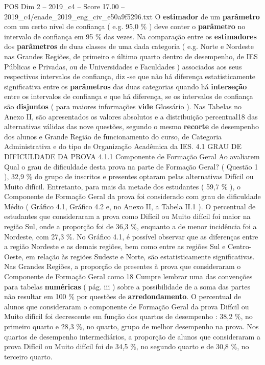 \begin{textsample}{POS Dim 2 – 2019\_c4 – Score 17.00 – 2019\_c4/enade\_2019\_eng\_civ\_e50a9f5296.txt}
O \textbf{estimador} de um \textbf{parâmetro} com um certo nível de confiança ( e.g. 95,0 \% ) deve conter o \textbf{parâmetro} no intervalo de confiança em 95 \% das vezes.
Na comparação entre os \textbf{estimadores} dos \textbf{parâmetros} de duas classes de uma dada categoria ( e.g.
Norte e Nordeste nas Grandes Regiões, de primeiro e último quarto dentro de desempenho, de IES Públicas e Privadas, ou de Universidades e Faculdades ) associados aos seus respectivos intervalos de confiança, diz -se que não há diferença estatisticamente significativa entre os \textbf{parâmetros} das duas categorias quando há \textbf{interseção} entre os intervalos de confiança e que há diferença, se os intervalos de confiança são \textbf{disjuntos} ( para maiores informações \textbf{vide} Glossário ).
Nas Tabelas no Anexo II, são apresentados os valores absolutos e a distribuição percentual18 das alternativas válidas das nove questões, segundo o mesmo \textbf{recorte} de desempenho dos alunos e Grande Região de funcionamento do curso, de Categoria Administrativa e do tipo de Organização Acadêmica da IES. 4.1 GRAU DE DIFICULDADE DA PROVA 4.1.1 Componente de Formação Geral Ao avaliarem Qual o grau de dificuldade desta prova na parte de Formação Geral? ( Questão 1 ), 32,9 \% do grupo de inscritos e presentes optaram pelas alternativas Difícil ou Muito difícil.
Entretanto, para mais da metade dos estudantes ( 59,7 \% ), o Componente de Formação Geral da prova foi considerado com grau de dificuldade Médio ( Gráfico 4.1, Gráfico 4.2 e, no Anexo II, a Tabela II.1 ).
O percentual de estudantes que consideraram a prova como Difícil ou Muito difícil foi maior na região Sul, onde a proporção foi de 36,3 \%, enquanto a de menor incidência foi a Nordeste, com 27,3 \%.
No Gráfico 4.1, é possível observar que as diferenças entre a região Nordeste e as demais regiões, bem como entre as regiões Sul e Centro-Oeste, em relação às regiões Sudeste e Norte, são estatisticamente significativas.
Nas Grandes Regiões, a proporção de presentes à prova que consideraram o Componente de Formação Geral como 18 Cumpre lembrar uma das convenções para tabelas \textbf{numéricas} ( pág. iii ) sobre a possibilidade de a soma das partes não resultar em 100 \% por questões de \textbf{arredondamento}.
O percentual de alunos que consideraram o componente de Formação Geral da prova Difícil ou Muito difícil foi decrescente em função dos quartos de desempenho : 38,2 \%, no primeiro quarto e 28,3 \%, no quarto, grupo de melhor desempenho na prova.
Nos quartos de desempenho intermediários, a proporção de alunos que consideraram a prova Difícil ou Muito difícil foi de 34,5 \%, no segundo quarto e de 30,8 \%, no terceiro quarto.

\end{textsample}
